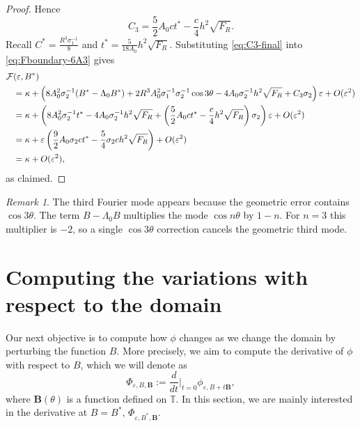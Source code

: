 \documentclass[12pt,reqno]{amsart}
\numberwithin{equation}{section}
\theoremstyle{definition}
\theoremstyle{remark}
\newtheorem{remark}[theorem]{Remark}
\begin{document}
\begin{proof}
Hence
\begin{equation}\label{eq:C3-final}
C_3=\frac{5}{2}A_0ct^*-\frac c4h^2\sqrt{F_R}.
\end{equation}
Recall $ C^*=\frac{R^3\sigma_1^{-1}}8 $ and $ t^*=\frac{5}{18A_0}h^2\sqrt{F_R} $. Substituting \eqref{eq:C3-final} into \eqref{eq:Fboundary-6A3} gives
\begin{equation}\label{eq:Fe-final-before-t}
\begin{split}
\mathcal F& (\varepsilon,B^*)\\
&=\kappa+ \left( 8 A_0^2 \sigma_2^{-1}  (B^*-\Lambda_0B^*)+2R^3A_0^2\sigma_1^{-1}\sigma_2^{-1} \cos3\theta -4A_0\sigma_2^{-1}  h^2\sqrt{F_R} 
+C_3\sigma_2\right) \varepsilon+O(\varepsilon^2)\\
&=\kappa+\left( 8A_0^2\sigma_2^{-1}  t^*-4A_0\sigma_2^{-1}  h^2\sqrt{F_R}
+\left(\frac{5}{2}A_0ct^*-\frac c4h^2\sqrt{F_R}\right)\sigma_2\right) \varepsilon+O(\varepsilon^2)\notag\\
&=\kappa+\varepsilon\left(\frac92A_0\sigma_2ct^*-\frac54\sigma_2ch^2\sqrt{F_R}\right)+O(\varepsilon^2)\\
&=\kappa +O(\varepsilon^2),
\end{split}
\end{equation}
as claimed.

 
\end{proof}



\begin{remark}\label{rem:third-mode-choice}
	The third Fourier mode appears because the geometric error contains $\cos3\theta$.  The term $B-\Lambda_0B$ multiplies the mode $\cos n\theta$ by $1-n$.  For $n=3$ this multiplier is $-2$, so a single $\cos3\theta$ correction cancels the geometric third mode.
\end{remark}
 
 \section{Computing the variations with respect to the domain}\label{sec:variation}
Our next objective is to compute how $\phi$ changes as we change the domain by perturbing the function $B$.
More precisely, we aim to compute the derivative of $\phi$ with respect to $B$, which we will denote as
\[
\Phi_{\varepsilon,B,\mathbf{B}} :=
\frac{d}{d t}\bigg|_{t=0} \phi_{\varepsilon,B+t\mathbf{B}} ,
\]
where $\mathbf{B}(\theta)$ is a function defined on $\mathbb{T}$.
In this section, we are mainly interested in the derivative at $B=B^*$,   $\Phi_{\varepsilon,B^*,\mathbf{B}}$.
\end{document}
